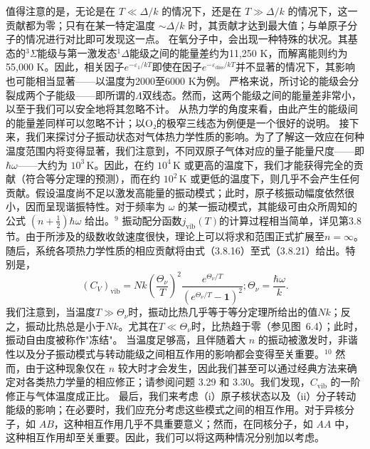 值得注意的是，无论是在 \(T \ll \Delta/k\) 的情况下，还是在 \(T \gg \Delta/k\) 的情况下，这一贡献都为零；只有在某一特定温度 \(\sim \Delta/k\) 时，其贡献才达到最大值；与单原子分子的情况进行对比即可发现这一点。
在氧分子中，会出现一种特殊的状况。其基态的\(^{3}\Sigma\)能级与第一激发态\(^{1}\Delta\)能级之间的能量差约为11,250 K，而解离能则约为55,000 K。因此，相关因子\(e^{-\varepsilon_{1}/kT}\)即使在因子\(e^{-\varepsilon_{\mathrm{diss}}/kT}\)并不显著的情况下，其影响也可能相当显著——以温度为2000至6000 K为例。
严格来说，所讨论的能级会分裂成两个子能级——即所谓的\(\Lambda\)双线态。然而，这两个能级之间的能量差非常小，以至于我们可以安全地将其忽略不计。
从热力学的角度来看，由此产生的能级间的能量差同样可以忽略不计；以O₂的极窄三线态为例便是一个很好的说明。
接下来，我们来探讨分子振动状态对气体热力学性质的影响。为了了解这一效应在何种温度范围内将变得显著，我们注意到，不同双原子气体对应的量子能量尺度——即 \(\hbar\omega\)——大约为 \(10^{3}\,\mathrm{K}\)。因此，在约 \(10^{4}\,\mathrm{K}\) 或更高的温度下，我们才能获得完全的贡献（符合等分定理的预测），而在约 \(10^{2}\,\mathrm{K}\) 或更低的温度下，则几乎不会产生任何贡献。假设温度尚不足以激发高能量的振动模式；此时，原子核振动幅度依然很小，因而呈现谐振特性。对于频率为 \(\omega\) 的某一振动模式，其能级可由众所周知的公式 \((n+\frac{1}{2})\hbar\omega\) 给出。\(^{9}\)
振动配分函数\(j_{\mathrm{vib}}(T)\)的计算过程相当简单，详见第3.8节。由于所涉及的级数收敛速度很快，理论上可以将求和范围正式扩展至\(n=\infty\)。随后，系统各项热力学性质的相应贡献将由式（3.8.16）至式（3.8.21）给出。特别是，
\begin{equation}\tag{6.5.18}\label{eq:6.5.18}
( C _ { V } ) _ { \mathrm { v i b } } = N k \left( \frac { \Theta _ { \nu } } { T } \right) ^{2} \frac { e ^{\Theta _ { \nu} / T } } { ( e ^{\Theta _ { \nu} / T } - \mathbf { 1 } ) ^{2} } ;  \Theta _ { \nu } = \frac { \hbar \omega } { k } .
\end{equation}
我们注意到，当温度\(T \gg \Theta_{\nu}\)时，振动比热几乎等于等分定理所给出的值\(Nk\)；反之，振动比热总是小于\(Nk\)。尤其在\(T \ll \Theta_{\nu}\)时，比热趋于零（参见图~6.4）；此时，振动自由度被称作"冻结"。
当温度足够高，且伴随着大 \(n\) 的振动被激发时，非谐性以及分子振动模式与转动能级之间相互作用的影响都会变得至关重要。\(^{10}\) 然而，由于这种现象仅在 \(n\) 较大时才会发生，因此我们甚至可以通过经典方法来确定对各类热力学量的相应修正；请参阅问题 3.29 和 3.30。我们发现，\(C_{\mathrm{vib}}\) 的一阶修正与气体温度成正比。
最后，我们来考虑（i）原子核状态以及（ii）分子转动能级的影响；在必要时，我们应充分考虑这些模式之间的相互作用。对于异核分子，如 \(AB\)，这种相互作用几乎不具重要意义；然而，在同核分子，如 \(AA\) 中，这种相互作用却至关重要。因此，我们可以将这两种情况分别加以考虑。

